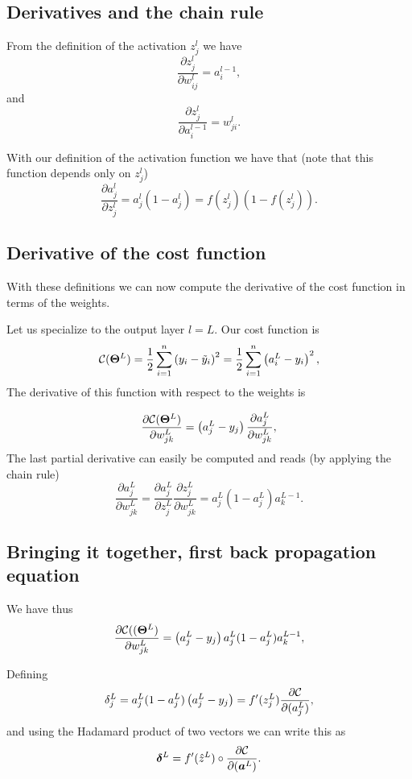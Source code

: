 \documentclass[%
oneside,                 %
final,                   %
10pt]{article}
\begin{document}
\subsection{Derivatives and the chain rule}

From the definition of the activation $z_j^l$ we have
\[
\frac{\partial z_j^l}{\partial w_{ij}^l} = a_i^{l-1},
\]
and
\[
\frac{\partial z_j^l}{\partial a_i^{l-1}} = w_{ji}^l. 
\]

With our definition of the activation function we have that (note that this function depends only on $z_j^l$)
\[
\frac{\partial a_j^l}{\partial z_j^{l}} = a_j^l(1-a_j^l)=f(z_j^l)(1-f(z_j^l)). 
\]

\subsection{Derivative of the cost function}

With these definitions we can now compute the derivative of the cost function in terms of the weights.

Let us specialize to the output layer $l=L$. Our cost function is
\[
{\cal C}(\bm{\Theta}^L)  =  \frac{1}{2}\sum_{i=1}^n\left(y_i - \tilde{y}_i\right)^2=\frac{1}{2}\sum_{i=1}^n\left(a_i^L - y_i\right)^2, 
\]
The derivative of this function with respect to the weights is

\[
\frac{\partial{\cal C}(\bm{\Theta}^L)}{\partial w_{jk}^L}  =  \left(a_j^L - y_j\right)\frac{\partial a_j^L}{\partial w_{jk}^{L}}, 
\]
The last partial derivative can easily be computed and reads (by applying the chain rule)
\[
\frac{\partial a_j^L}{\partial w_{jk}^{L}} = \frac{\partial a_j^L}{\partial z_{j}^{L}}\frac{\partial z_j^L}{\partial w_{jk}^{L}}=a_j^L(1-a_j^L)a_k^{L-1}.  
\]

\subsection{Bringing it together, first back propagation equation}

We have thus
\[
\frac{\partial{\cal C}((\bm{\Theta}^L)}{\partial w_{jk}^L}  =  \left(a_j^L - y_j\right)a_j^L(1-a_j^L)a_k^{L-1}, 
\]

Defining
\[
\delta_j^L = a_j^L(1-a_j^L)\left(a_j^L - y_j\right) = f'(z_j^L)\frac{\partial {\cal C}}{\partial (a_j^L)},
\]
and using the Hadamard product of two vectors we can write this as
\[
\bm{\delta}^L = f'(\hat{z}^L)\circ\frac{\partial {\cal C}}{\partial (\bm{a}^L)}.
\]
\end{document}
